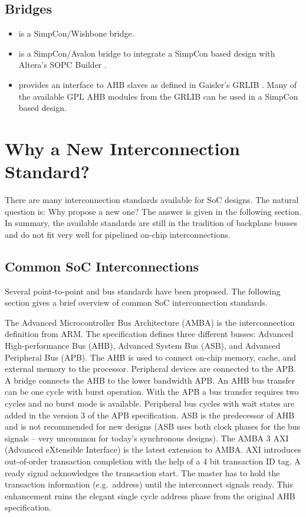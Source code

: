 \subsection{Bridges}

\begin{itemize}
    \item {} is a SimpCon/Wishbone \cite{soc:wishbone}
    bridge.
    \item {} is a SimpCon/Avalon \cite{soc:avalon}
    bridge to integrate a SimpCon based design with Altera's SOPC
    Builder \cite{quartus}.
    \item {} provides an interface to AHB slaves as
    defined in Gaisler's GRLIB \cite{grlib}. Many of the available
    GPL AHB modules from the GRLIB can be used in a SimpCon based
    design.
\end{itemize}


\section{Why a New Interconnection Standard?}

There are many interconnection standards available for SoC designs.
The natural question is: Why propose a new one? The answer is given
in the following section. In summary, the available standards are
still in the tradition of backplane busses and do not fit very well
for pipelined on-chip interconnections.

\subsection{Common SoC Interconnections}


Several point-to-point and bus standards have been proposed. The
following section gives a brief overview of common SoC
interconnection standards.

The Advanced Microcontroller Bus Architecture (AMBA) \cite{soc:amba}
is the interconnection definition from ARM. The specification defines
three different busses: Advanced High-performance Bus (AHB), Advanced
System Bus (ASB), and Advanced Peripheral Bus (APB). The AHB is used
to connect on-chip memory, cache, and external memory to the
processor. Peripheral devices are connected to the APB. A bridge
connects the AHB to the lower bandwidth APB. An AHB bus transfer can
be one cycle with burst operation. With the APB a bus transfer
requires two cycles and no burst mode is available. Peripheral bus
cycles with wait states are added in the version 3 of the APB
specification. ASB is the predecessor of AHB and is not recommended
for new designs (ASB uses both clock phases for the bus signals --
very uncommon for today's synchronous designs). The AMBA 3 AXI
(Advanced eXtensible Interface) \cite{soc:amba3} is the latest
extension to AMBA. AXI introduces out-of-order transaction completion
with the help of a 4 bit transaction ID tag. A ready signal
acknowledges the transaction start. The master has to hold the
transaction information (e.g.\ address) until the interconnect
signals ready. This enhancement ruins the elegant single cycle
address phase from the original AHB specification.

